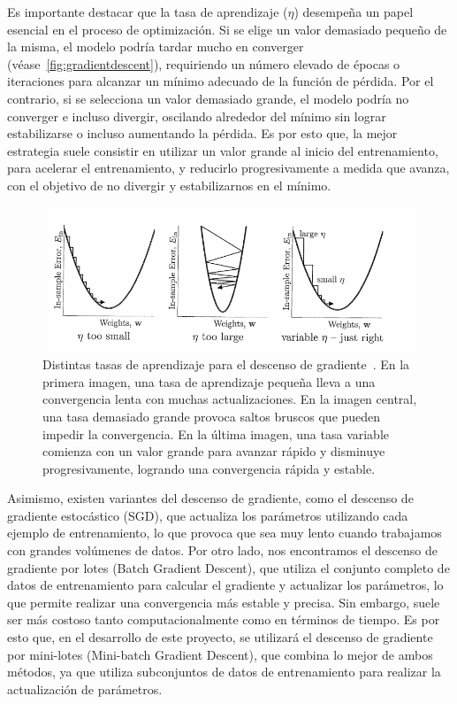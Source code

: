 Es importante destacar que la tasa de aprendizaje ($\eta$) desempeña un papel esencial en el proceso de optimización. Si se elige un valor demasiado pequeño de la misma, el modelo podría tardar mucho en converger (véase~\autoref{fig:gradientdescent}), requiriendo un número elevado de épocas o iteraciones para alcanzar un mínimo adecuado de la función de pérdida. Por el contrario, si se selecciona un valor demasiado grande, el modelo podría no converger e incluso divergir, oscilando alrededor del mínimo sin lograr estabilizarse o incluso aumentando la pérdida. Es por esto que, la mejor estrategia suele consistir en utilizar un valor grande al inicio del entrenamiento, para acelerar el entrenamiento, y reducirlo progresivamente a medida que avanza, con el objetivo de no divergir y estabilizarnos en el mínimo.\newline

\begin{figure}[h]
    \centering
    \includegraphics[width=0.9\linewidth]{img/gradientdescent.png}
    \caption[Distintas tasas de aprendizaje para el descenso de gradiente~\cite{Mostafa2012}.]{Distintas tasas de aprendizaje para el descenso de gradiente~\cite{Mostafa2012}. En la primera imagen, una tasa de aprendizaje pequeña lleva a una convergencia lenta con muchas actualizaciones. En la imagen central, una tasa demasiado grande provoca saltos bruscos que pueden impedir la convergencia. En la última imagen, una tasa variable comienza con un valor grande para avanzar rápido y disminuye progresivamente, logrando una convergencia rápida y estable.}\label{fig:gradientdescent}
\end{figure}

Asimismo, existen variantes del descenso de gradiente, como el descenso de gradiente estocástico (SGD), que actualiza los parámetros utilizando cada ejemplo de entrenamiento, lo que provoca que sea muy lento cuando trabajamos con grandes volúmenes de datos. Por otro lado, nos encontramos el descenso de gradiente por lotes (Batch Gradient Descent), que utiliza el conjunto completo de datos de entrenamiento para calcular el gradiente y actualizar los parámetros, lo que permite realizar una convergencia más estable y precisa. Sin embargo, suele ser más costoso tanto computacionalmente como en términos de tiempo. Es por esto que, en el desarrollo de este proyecto, se utilizará el descenso de gradiente por mini-lotes (Mini-batch Gradient Descent), que combina lo mejor de ambos métodos, ya que utiliza subconjuntos de datos de entrenamiento para realizar la actualización de parámetros.\newline

